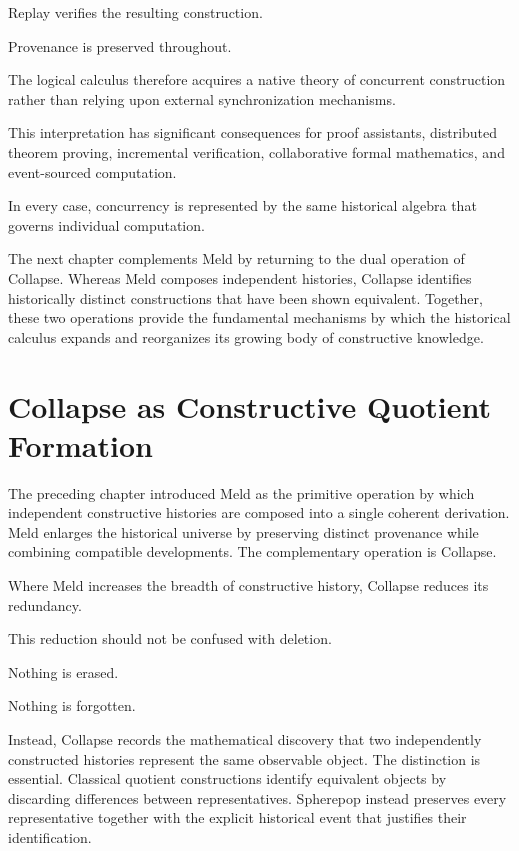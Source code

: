 \documentclass[12pt,oneside]{article}
\theoremstyle{definition}
\theoremstyle{remark}
\begin{document}
Replay verifies the resulting construction.

Provenance is preserved throughout.

The logical calculus therefore acquires a native theory of concurrent
construction rather than relying upon external synchronization mechanisms.

This interpretation has significant consequences for proof assistants,
distributed theorem proving, incremental verification, collaborative formal
mathematics, and event-sourced computation.

In every case, concurrency is represented by the same historical algebra that
governs individual computation.

The next chapter complements Meld by returning to the dual operation of
Collapse. Whereas Meld composes independent histories, Collapse identifies
historically distinct constructions that have been shown equivalent. Together,
these two operations provide the fundamental mechanisms by which the historical
calculus expands and reorganizes its growing body of constructive knowledge.

\section{Collapse as Constructive Quotient Formation}

The preceding chapter introduced Meld as the primitive operation by which
independent constructive histories are composed into a single coherent
derivation. Meld enlarges the historical universe by preserving distinct
provenance while combining compatible developments. The complementary operation
is Collapse.

Where Meld increases the breadth of constructive history, Collapse reduces its
redundancy.

This reduction should not be confused with deletion.

Nothing is erased.

Nothing is forgotten.

Instead, Collapse records the mathematical discovery that two independently
constructed histories represent the same observable object. The distinction is
essential. Classical quotient constructions identify equivalent objects by
discarding differences between representatives. Spherepop instead preserves
every representative together with the explicit historical event that justifies
their identification.
\end{document}
